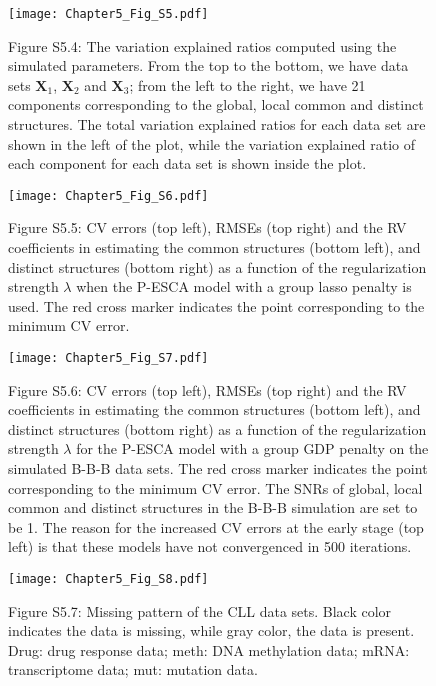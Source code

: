 \begin{figure}[htbp]
    \centering
    \texttt{[image: Chapter5\_Fig\_S5.pdf]}
    \caption*{Figure S5.4: The variation explained ratios computed using the simulated parameters. From the top to the bottom, we have data sets $\mathbf{X}_1$, $\mathbf{X}_2$ and $\mathbf{X}_3$; from the left to the right, we have 21 components corresponding to the global, local common and distinct structures. The total variation explained ratios for each data set are shown in the left of the plot, while the variation explained ratio of each component for each data set is shown inside the plot.}
	\label{chapter5_fig:S5}
\end{figure}

\begin{figure}[htbp]
    \centering
    \texttt{[image: Chapter5\_Fig\_S6.pdf]}
    \caption*{Figure S5.5: CV errors (top left), RMSEs (top right) and the RV coefficients in estimating the common structures (bottom left), and distinct structures (bottom right) as a function of the regularization strength $\lambda$ when the P-ESCA model with a group lasso penalty is used. The red cross marker indicates the point corresponding to the minimum CV error.}
	\label{chapter5_fig:S6}
\end{figure}

\begin{figure}[htbp]
    \centering
    \texttt{[image: Chapter5\_Fig\_S7.pdf]}
    \caption*{Figure S5.6: CV errors (top left), RMSEs (top right) and the RV coefficients in estimating the common structures (bottom left), and distinct structures (bottom right) as a function of the regularization strength $\lambda$ for the P-ESCA model with a group GDP penalty on the simulated B-B-B data sets. The red cross marker indicates the point corresponding to the minimum CV error. The SNRs of global, local common and distinct structures in the B-B-B simulation are set to be 1. The reason for the increased CV errors at the early stage (top left) is that these models have not convergenced in 500 iterations.}
	\label{chapter5_fig:S7}
\end{figure}

\begin{figure}[htbp]
    \centering
    \texttt{[image: Chapter5\_Fig\_S8.pdf]}
    \caption*{Figure S5.7: Missing pattern of the CLL data sets. Black color indicates the data is missing, while gray color, the data is present. Drug: drug response data; meth: DNA methylation data; mRNA: transcriptome data; mut: mutation data.}
	\label{chapter5_fig:S8}
\end{figure}

